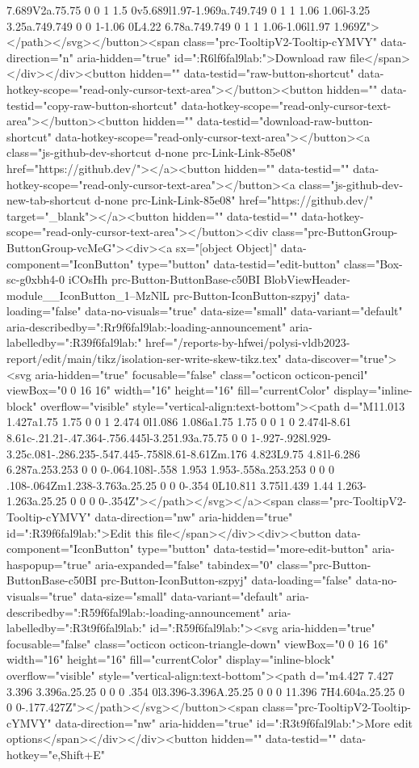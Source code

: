 {{{{{{{{{{{{{{{{{{{{{{{{{{{{{7.689V2a.75.75 0 0 1 1.5 0v5.689l1.97-1.969a.749.749 0 1 1 1.06 1.06l-3.25 3.25a.749.749 0 0 1-1.06 0L4.22 6.78a.749.749 0 1 1 1.06-1.06l1.97 1.969Z"></path></svg></button><span class="prc-TooltipV2-Tooltip-cYMVY" data-direction="n" aria-hidden="true" id=":R6lf6fal9lab:">Download raw file</span></div></div><button hidden="" data-testid="raw-button-shortcut" data-hotkey-scope="read-only-cursor-text-area"></button><button hidden="" data-testid="copy-raw-button-shortcut" data-hotkey-scope="read-only-cursor-text-area"></button><button hidden="" data-testid="download-raw-button-shortcut" data-hotkey-scope="read-only-cursor-text-area"></button><a class="js-github-dev-shortcut d-none prc-Link-Link-85e08" href="https://github.dev/"></a><button hidden="" data-testid="" data-hotkey-scope="read-only-cursor-text-area"></button><a class="js-github-dev-new-tab-shortcut d-none prc-Link-Link-85e08" href="https://github.dev/" target="_blank"></a><button hidden="" data-testid="" data-hotkey-scope="read-only-cursor-text-area"></button><div class="prc-ButtonGroup-ButtonGroup-vcMeG"><div><a sx="[object Object]" data-component="IconButton" type="button" data-testid="edit-button" class="Box-sc-g0xbh4-0 iCOsHh prc-Button-ButtonBase-c50BI BlobViewHeader-module__IconButton_1--MzNlL prc-Button-IconButton-szpyj" data-loading="false" data-no-visuals="true" data-size="small" data-variant="default" aria-describedby=":Rr9f6fal9lab:-loading-announcement" aria-labelledby=":R39f6fal9lab:" href="/reports-by-hfwei/polysi-vldb2023-report/edit/main/tikz/isolation-ser-write-skew-tikz.tex" data-discover="true"><svg aria-hidden="true" focusable="false" class="octicon octicon-pencil" viewBox="0 0 16 16" width="16" height="16" fill="currentColor" display="inline-block" overflow="visible" style="vertical-align:text-bottom"><path d="M11.013 1.427a1.75 1.75 0 0 1 2.474 0l1.086 1.086a1.75 1.75 0 0 1 0 2.474l-8.61 8.61c-.21.21-.47.364-.756.445l-3.251.93a.75.75 0 0 1-.927-.928l.929-3.25c.081-.286.235-.547.445-.758l8.61-8.61Zm.176 4.823L9.75 4.81l-6.286 6.287a.253.253 0 0 0-.064.108l-.558 1.953 1.953-.558a.253.253 0 0 0 .108-.064Zm1.238-3.763a.25.25 0 0 0-.354 0L10.811 3.75l1.439 1.44 1.263-1.263a.25.25 0 0 0 0-.354Z"></path></svg></a><span class="prc-TooltipV2-Tooltip-cYMVY" data-direction="nw" aria-hidden="true" id=":R39f6fal9lab:">Edit this file</span></div><div><button data-component="IconButton" type="button" data-testid="more-edit-button" aria-haspopup="true" aria-expanded="false" tabindex="0" class="prc-Button-ButtonBase-c50BI prc-Button-IconButton-szpyj" data-loading="false" data-no-visuals="true" data-size="small" data-variant="default" aria-describedby=":R59f6fal9lab:-loading-announcement" aria-labelledby=":R3t9f6fal9lab:" id=":R59f6fal9lab:"><svg aria-hidden="true" focusable="false" class="octicon octicon-triangle-down" viewBox="0 0 16 16" width="16" height="16" fill="currentColor" display="inline-block" overflow="visible" style="vertical-align:text-bottom"><path d="m4.427 7.427 3.396 3.396a.25.25 0 0 0 .354 0l3.396-3.396A.25.25 0 0 0 11.396 7H4.604a.25.25 0 0 0-.177.427Z"></path></svg></button><span class="prc-TooltipV2-Tooltip-cYMVY" data-direction="nw" aria-hidden="true" id=":R3t9f6fal9lab:">More edit options</span></div></div><button hidden="" data-testid="" data-hotkey="e,Shift+E" }}}}}}}}}}}}}}}}}}}}}}}}}}}}}
